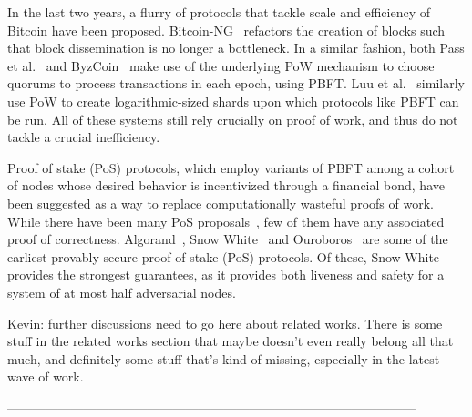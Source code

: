 In the last two years, a flurry of protocols that tackle scale and efficiency of Bitcoin have been proposed. 
Bitcoin-NG~\cite{eyal2016bitcoin} refactors the creation of blocks such that block dissemination is no longer a bottleneck.
In a similar fashion, both Pass et al.~\cite{pass2016hybrid} and ByzCoin~\cite{kokoris2016enhancing} make use of the underlying PoW mechanism to choose quorums to process transactions in each epoch, using PBFT.
Luu et al.~\cite{luusharding2016} similarly use PoW to create logarithmic-sized shards upon which protocols like PBFT can be run.
All of these systems still rely crucially on proof of work, and thus do not tackle a crucial inefficiency.

Proof of stake (PoS) protocols, which employ variants of PBFT among a cohort of nodes whose desired behavior is incentivized through a financial bond, have been suggested as a way to replace computationally wasteful proofs of work. 
While there have been many PoS proposals~\cite{peercoin,NXT,steem,casper,bentovpoa}, few of them have any associated proof of correctness.
Algorand~\cite{micali2017algorand}, Snow White~\cite{bentovsnow} and Ouroboros~\cite{kiayias2016provably} are some of the earliest provably secure proof-of-stake (PoS) protocols. Of these, Snow White provides the strongest guarantees, as it provides both liveness and safety for a system of at most half adversarial nodes. 

{\color{blue}Kevin: further discussions need to go here about related works. There is some stuff in the related works section that maybe doesn't even really belong all that much, and definitely some stuff that's kind of missing, especially in the latest wave of work.}


------------------------------------------------------------------------------------------------

